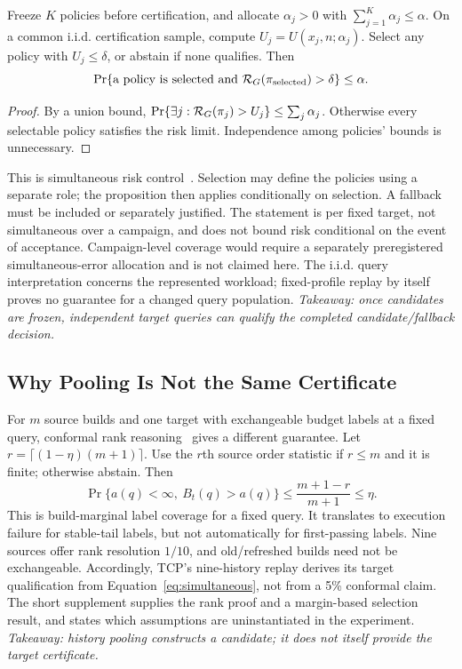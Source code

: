 \begin{proposition}
\label{prop:simultaneous}
Freeze $K$ policies before certification, and allocate $\alpha_j>0$ with $\sum_{j=1}^K\alpha_j\le\alpha$. On a common i.i.d. certification sample, compute $U_j=U(x_j,n;\alpha_j)$. Select any policy with $U_j\le\delta$, or abstain if none qualifies. Then
\begin{equation}
 \Pr\{\text{a policy is selected and }\mathcal{R}_G(\pi_{\rm selected})>\delta\}\le\alpha.\label{eq:simultaneous}
\end{equation}
\end{proposition}
\begin{proof}
By a union bound, $\Pr\{\exists j:\mathcal{R}_G(\pi_j)>U_j\}\le\sum_j\alpha_j$. Otherwise every selectable policy satisfies the risk limit. Independence among policies' bounds is unnecessary.
\end{proof}
This is simultaneous risk control~\cite{angelopoulos2021ltt}. Selection may define the policies using a separate role; the proposition then applies conditionally on selection. A fallback must be included or separately justified. The statement is per fixed target, not simultaneous over a campaign, and does not bound risk conditional on the event of acceptance. Campaign-level coverage would require a separately preregistered simultaneous-error allocation and is not claimed here. The i.i.d. query interpretation concerns the represented workload; fixed-profile replay by itself proves no guarantee for a changed query population. \emph{Takeaway: once candidates are frozen, independent target queries can qualify the completed candidate/fallback decision.}

\subsection{Why Pooling Is Not the Same Certificate}
\label{sec:pooling-theory}
For $m$ source builds and one target with exchangeable budget labels at a fixed query, conformal rank reasoning~\cite{angelopoulos2023conformal} gives a different guarantee. Let $r=\lceil(1-\eta)(m+1)\rceil$. Use the $r$th source order statistic if $r\le m$ and it is finite; otherwise abstain. Then
\begin{equation}
 \Pr\{a(q)<\infty,\ B_t(q)>a(q)\}\le\frac{m+1-r}{m+1}\le\eta.\label{eq:pooling}
\end{equation}
This is build-marginal label coverage for a fixed query. It translates to execution failure for stable-tail labels, but not automatically for first-passing labels. Nine sources offer rank resolution $1/10$, and old/refreshed builds need not be exchangeable. Accordingly, TCP's nine-history replay derives its target qualification from Equation~\eqref{eq:simultaneous}, not from a 5\% conformal claim. The short supplement supplies the rank proof and a margin-based selection result, and states which assumptions are uninstantiated in the experiment. \emph{Takeaway: history pooling constructs a candidate; it does not itself provide the target certificate.}
